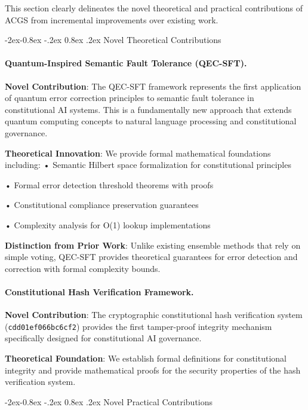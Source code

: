 \documentclass[manuscript,screen,9pt]{acmart}
\makeatletter
\renewcommand\subsubsection{\@startsection{subsubsection}{3}{\z@}%
  {-2ex\@plus -0.8ex \@minus -.2ex}%
  {0.8ex \@plus .2ex}%
  {\normalfont\normalsize\bfseries}}
\makeatother
\begin{document}
This section clearly delineates the novel theoretical and practical contributions of ACGS from incremental improvements over existing work.

\subsubsection{Novel Theoretical Contributions}
\label{subsubsec:novel_theoretical}

\paragraph{Quantum-Inspired Semantic Fault Tolerance (QEC-SFT).}
\textbf{Novel Contribution}: The QEC-SFT framework represents the first application of quantum error correction principles to semantic fault tolerance in constitutional AI systems. This is a fundamentally new approach that extends quantum computing concepts to natural language processing and constitutional governance.

\textbf{Theoretical Innovation}: We provide formal mathematical foundations including:
\noindent• Semantic Hilbert space formalization for constitutional principles

\noindent• Formal error detection threshold theorems with proofs

\noindent• Constitutional compliance preservation guarantees

\noindent• Complexity analysis for O(1) lookup implementations

\textbf{Distinction from Prior Work}: Unlike existing ensemble methods that rely on simple voting, QEC-SFT provides theoretical guarantees for error detection and correction with formal complexity bounds.

\paragraph{Constitutional Hash Verification Framework.}
\textbf{Novel Contribution}: The cryptographic constitutional hash verification system (\texttt{cdd01ef066bc6cf2}) provides the first tamper-proof integrity mechanism specifically designed for constitutional AI governance.

\textbf{Theoretical Foundation}: We establish formal definitions for constitutional integrity and provide mathematical proofs for the security properties of the hash verification system.

\subsubsection{Novel Practical Contributions}
\label{subsubsec:novel_practical}
\end{document}
